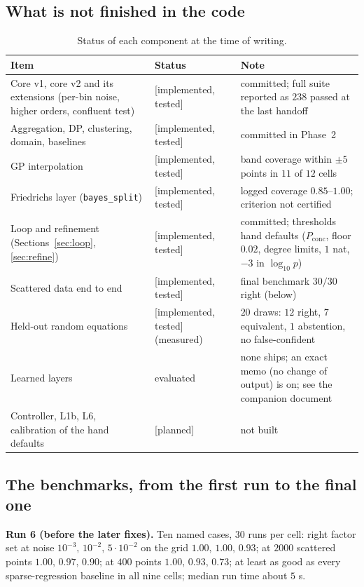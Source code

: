 \documentclass[11pt,a4paper]{article}
\theoremstyle{definition}
\newcommand{\badge}[2]{\textcolor{#1}{\textsf{\footnotesize[#2]}}}
\newcommand{\impl}{\badge{cC}{implemented, tested}}
\newcommand{\plan}{\badge{cB}{planned}}
\begin{document}
\subsection{What is not finished in the code}
\begin{table}[!htb]
\centering\small
\begin{tabular}{@{}L{4.6cm}L{2.4cm}L{5.8cm}@{}}
\toprule
Item & Status & Note\\\midrule
Core v1, core v2 and its extensions (per-bin noise, higher orders, confluent test) & \impl{} & committed; full suite reported as $238$ passed at the last handoff\\
Aggregation, DP, clustering, domain, baselines & \impl{} & committed in Phase~2\\
GP interpolation & \impl{} & band coverage within $\pm5$ points in $11$ of $12$ cells\\
Friedrichs layer (\texttt{bayes\_split}) & \impl{} & logged coverage $0.85$--$1.00$; criterion not certified\\
Loop and refinement (Sections~\ref{sec:loop}, \ref{sec:refine}) & \impl{} & committed; thresholds hand defaults ($P_{\mathrm{conc}}$, floor $0.02$, degree limits, $1$ nat, $-3$ in $\log_{10}p$)\\
Scattered data end to end & \impl{} & final benchmark $30/30$ right (below)\\
Held-out random equations & \impl{} (measured) & $20$ draws: $12$ right, $7$ equivalent, $1$ abstention, no false-confident\\
Learned layers & evaluated & none ships; an exact memo (no change of output) is on; see the companion document\\
Controller, L1b, L6, calibration of the hand defaults & \plan{} & not built\\
\bottomrule
\end{tabular}
\caption{Status of each component at the time of writing.}
\end{table}

\subsection{The benchmarks, from the first run to the final one}
\textbf{Run 6 (before the later fixes).} Ten named cases, $30$ runs per cell: right factor set at noise $10^{-3},\,10^{-2},\,5\cdot10^{-2}$ on the grid $1.00,\,1.00,\,0.93$; at $2000$ scattered points $1.00,\,0.97,\,0.90$; at $400$ points $1.00,\,0.93,\,0.73$; at least as good as every sparse-regression baseline in all nine cells; median run time about $5$ s.
\end{document}

